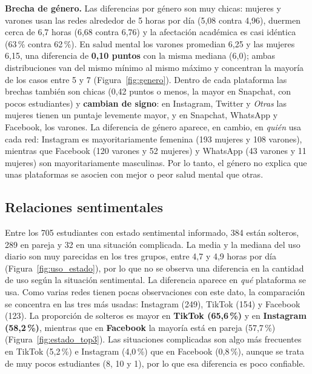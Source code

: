 \textbf{Brecha de género.} Las diferencias por género son muy chicas: mujeres y varones usan las redes
alrededor de 5 horas por día (5,08 contra 4,96), duermen cerca de 6,7 horas (6,68 contra 6,76) y la
afectación académica es casi idéntica (63\,\% contra 62\,\%). En salud mental los varones promedian 6,25 y
las mujeres 6,15, una diferencia de \textbf{0,10 puntos} con la misma mediana (6,0); ambas distribuciones
van del mismo mínimo al mismo máximo y concentran la mayoría de los casos entre 5 y 7
(Figura~\ref{fig:genero}). Dentro de cada plataforma las brechas también son chicas (0,42 puntos o menos,
la mayor en Snapchat, con pocos estudiantes) y \textbf{cambian de signo}: en Instagram, Twitter y
\emph{Otras} las mujeres tienen un puntaje levemente mayor, y en Snapchat, WhatsApp y Facebook, los
varones. La diferencia de género aparece, en cambio, en \emph{quién} usa cada red: Instagram es
mayoritariamente femenina (193 mujeres y 108 varones), mientras que Facebook (120 varones y 52 mujeres) y
WhatsApp (43 varones y 11 mujeres) son mayoritariamente masculinas. Por lo tanto, el género no explica que
unas plataformas se asocien con mejor o peor salud mental que otras.

\subsection{Relaciones sentimentales}

Entre los 705 estudiantes con estado sentimental informado, 384 están solteros, 289 en pareja y 32 en
una situación complicada. La media y la mediana del uso diario son muy parecidas en los tres grupos, entre
4,7 y 4,9 horas por día (Figura~\ref{fig:uso_estado}), por lo que no se observa una diferencia en la
cantidad de uso según la situación sentimental. La diferencia aparece en \emph{qué} plataforma se usa.
Como varias redes tienen pocas observaciones con este dato, la comparación se concentra en las tres más
usadas: Instagram (249), TikTok (154) y Facebook (123). La proporción de solteros es mayor en
\textbf{TikTok (65,6\,\%)} y en \textbf{Instagram (58,2\,\%)}, mientras que en \textbf{Facebook} la mayoría
está en pareja (57,7\,\%) (Figura~\ref{fig:estado_top3}). Las situaciones complicadas son algo más
frecuentes en TikTok (5,2\,\%) e Instagram (4,0\,\%) que en Facebook (0,8\,\%), aunque se trata de muy pocos
estudiantes (8, 10 y 1), por lo que esa diferencia es poco confiable.

